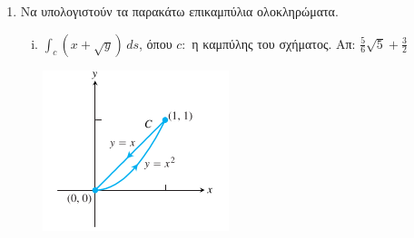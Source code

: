 \begin{enumerate}
\begin{enumerate}[i)]
    \end{enumerate}

  \item Να υπολογιστούν τα παρακάτω επικαμπύλια ολοκληρώματα. 
    \begin{enumerate}[i)]
      \item $ \int _{c} (x+ \sqrt{y}) \,{ds} $, όπου $ c \colon $ η καμπύλης του 
        σχήματος.
        \hfill Απ: $ \frac{5}{6} \sqrt{5} + \frac{3}{2} $ 

        \includegraphics[scale=0.5]{int2.png}

    \end{enumerate}


\end{enumerate}




